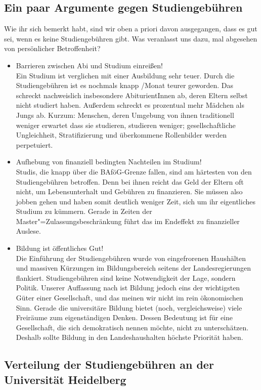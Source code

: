 \subsection*{Ein paar Argumente gegen Studiengebühren}

Wie ihr sich bemerkt habt, sind wir oben a priori davon ausgegangen, dass es gut sei, wenn es keine Studiengebühren gibt. Was veranlasst uns dazu, mal abgesehen von persönlicher Betroffenheit?
\begin{itemize}
\item {Barrieren zwischen Abi und Studium einreißen!}\\Ein Studium ist verglichen mit einer Ausbildung sehr teuer. Durch die Studiengebühren ist es nochmals knapp /Monat teurer geworden. Das schreckt nachweislich insbesondere AbiturientInnen ab, deren Eltern selbst nicht studiert haben. Außerdem schreckt es prozentual mehr Mädchen als Jungs ab. Kurzum: Menschen, deren Umgebung von ihnen traditionell weniger erwartet dass sie studieren, studieren weniger; gesellschaftliche Ungleichheit, Stratifizierung und überkommene Rollenbilder werden perpetuiert.
\item {Aufhebung von finanziell bedingten Nachteilen im Studium!}\\Studis, die knapp über die BAföG-Grenze fallen, sind am härtesten von den Studiengebühren betroffen. Denn bei ihnen reicht das Geld der Eltern oft nicht, um Lebensunterhalt und Gebühren zu finanzieren. Sie müssen also jobben gehen und haben somit deutlich weniger Zeit, sich um ihr eigentliches Studium zu kümmern. Gerade in Zeiten der Master"=Zulassungsbeschränkung führt das im Endeffekt zu finanzieller Auslese.
\item {Bildung ist öffentliches Gut!}\\Die Einführung der Studiengebühren wurde von eingefrorenen Haushälten und massiven Kürzungen im Bildungsbereich seitens der Landesregierungen flankiert. Studiengebühren sind keine Notwendigkeit der Lage, sondern Politik. Unserer Auffassung nach ist Bildung jedoch eins der wichtigsten Güter einer Gesellschaft, und das meinen wir nicht im rein ökonomischen Sinn. Gerade die universitäre Bildung bietet (noch, vergleichsweise) viele Freiräume zum eigenständigen Denken. Dessen Bedeutung ist für eine Gesellschaft, die sich demokratisch nennen möchte, nicht zu unterschätzen. Deshalb sollte Bildung in den Landeshaushalten höchste Priorität haben.
\end{itemize}


\subsection*{Verteilung der Studiengebühren an der Universität Heidelberg}


